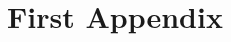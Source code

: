 \setcounter{figure}{0}
\setcounter{listing}{0}

\chapter{First Appendix \label{chapter:appendix-01} }

\begin{refsegment}

% 


\end{refsegment}
